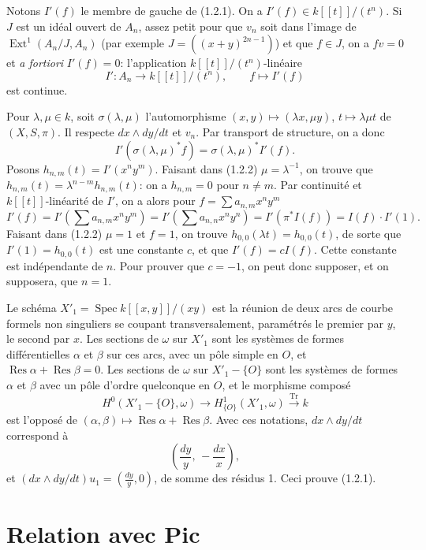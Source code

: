 \documentclass[11pt]{article}
\DeclareMathOperator{\Spec}{Spec}
\DeclareMathOperator{\Ext}{Ext}
\DeclareMathOperator{\Res}{Res}
\DeclareMathOperator{\Tr}{Tr}
\begin{document}
Notons $I'(f)$ le membre de gauche de (1.2.1). On a $I'(f)\in k[[t]]/(t^n)$. Si $J$ est un idéal ouvert de $A_n$, assez petit pour que $v_n$ soit dans l'image de $\Ext^1(A_n/J,A_n)$ (par exemple $J=((x+y)^{2n-1})$) et que $f\in J$, on a $fv=0$ et \emph{a fortiori} $I'(f)=0$: l'application $k[[t]]/(t^n)$-linéaire
\[
        I':A_n\longrightarrow k[[t]]/(t^n),\qquad f\longmapsto I'(f)
\]
est continue.

Pour $\lambda,\mu\in k$, soit $\sigma(\lambda,\mu)$ l'automorphisme $(x,y)\mapsto(\lambda x,\mu y)$, $t\mapsto\lambda\mu t$ de $(X,S,\pi)$. Il respecte $dx\wedge dy/dt$ et $v_n$. Par transport de structure, on a donc
\begin{equation}
        I'(\sigma(\lambda,\mu)^*f)=\sigma(\lambda,\mu)^*I'(f). \tag{1.2.2}
\end{equation}
Posons $h_{n,m}(t)=I'(x^ny^m)$. Faisant dans (1.2.2) $\mu=\lambda^{-1}$, on trouve que $h_{n,m}(t)=\lambda^{n-m}h_{n,m}(t)$: on a $h_{n,m}=0$ pour $n\ne m$. Par continuité et $k[[t]]$-linéarité de $I'$, on a alors pour $f=\sum a_{n,m}x^ny^m$
\[
        I'(f)=I'\left(\sum a_{n,m}x^ny^m\right)
             =I'\left(\sum a_{n,n}x^ny^n\right)
             =I'(\pi^*I(f))=I(f)\cdot I'(1).
\]
Faisant dans (1.2.2) $\mu=1$ et $f=1$, on trouve $h_{0,0}(\lambda t)=h_{0,0}(t)$, de sorte que $I'(1)=h_{0,0}(t)$ est une constante $c$, et que $I'(f)=cI(f)$. Cette constante est indépendante de $n$. Pour prouver que $c=-1$, on peut donc supposer, et on supposera, que $n=1$.

Le schéma $X'_1=\Spec k[[x,y]]/(xy)$ est la réunion de deux arcs de courbe formels non singuliers se coupant transversalement, paramétrés le premier par $y$, le second par $x$. Les sections de $\omega$ sur $X'_1$ sont les systèmes de formes différentielles $\alpha$ et $\beta$ sur ces arcs, avec un pôle simple en $O$, et $\Res\alpha+\Res\beta=0$. Les sections de $\omega$ sur $X'_1-\{O\}$ sont les systèmes de formes $\alpha$ et $\beta$ avec un pôle d'ordre quelconque en $O$, et le morphisme composé
\[
        H^0(X'_1-\{O\},\omega)\longrightarrow H^1_{\{O\}}(X'_1,\omega)\xrightarrow{\Tr} k
\]
est l'opposé de $(\alpha,\beta)\mapsto\Res\alpha+\Res\beta$. Avec ces notations, $dx\wedge dy/dt$ correspond à
\[
        \left(\frac{dy}{y},\,-\frac{dx}{x}\right),
\]
et $(dx\wedge dy/dt)u_1=\left(\frac{dy}{y},0\right)$, de somme des résidus 1. Ceci prouve (1.2.1).

\section{Relation avec Pic}
\end{document}
